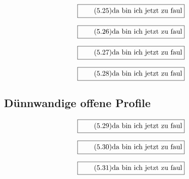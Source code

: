 \documentclass[11pt]{article}
\newcommand{\1}{ {\mathds{1}} }
\begin{document}
		\begin{equation}
			\boxed{
				\tag{5.25}
				\begin{split}
					\text{da bin ich jetzt zu faul}
				\end{split}
			}
		\end{equation}

		\begin{equation}
			\boxed{
				\tag{5.26}
				\begin{split}
					\text{da bin ich jetzt zu faul}
				\end{split}
			}
		\end{equation}

		\begin{equation}
			\boxed{
				\tag{5.27}
				\begin{split}
					\text{da bin ich jetzt zu faul}
				\end{split}
			}
		\end{equation}
		
		\begin{equation}
			\boxed{
				\tag{5.28}
				\begin{split}
					\text{da bin ich jetzt zu faul}
				\end{split}
			}
		\end{equation}

		\subsection{Dünnwandige offene Profile}

		\begin{equation}
			\boxed{
				\tag{5.29}
				\begin{split}
					\text{da bin ich jetzt zu faul}
				\end{split}
			}
		\end{equation}

		\begin{equation}
			\boxed{
				\tag{5.30}
				\begin{split}
					\text{da bin ich jetzt zu faul}
				\end{split}
			}
		\end{equation}

		\begin{equation}
			\boxed{
				\tag{5.31}
				\begin{split}
					\text{da bin ich jetzt zu faul}
				\end{split}
			}
		\end{equation}
\end{document}
